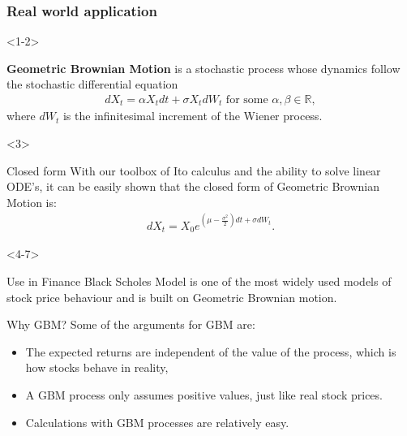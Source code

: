 \documentclass[10pt]{beamer}
\begin{document}
\begin{frame}[t]
  \frametitle{Real world application}
  \begin{onlyenv}<1-2>
    \begin{definition}
      \textbf{Geometric Brownian Motion} is a stochastic process whose dynamics follow the stochastic differential equation 
      \begin{align*}
        dX_t = \alpha X_t dt + \sigma X_t dW_t \text{ for some } \alpha,\beta \in \mathbb{R},
      \end{align*}
      where $dW_t$ is the infinitesimal increment of the Wiener process.
    \end{definition}
  \end{onlyenv}
  \begin{onlyenv}<3>
    \begin{block}{Closed form}
      With our toolbox of Ito calculus and the ability to solve linear ODE's, it can be easily shown that the closed form of Geometric Brownian Motion is:
      \begin{align*}
        dX_t = X_0 e^{(\mu - \frac{\sigma^2}{2})dt + \sigma dW_t}.
      \end{align*}
    \end{block}
  \end{onlyenv}
  \begin{onlyenv}<4-7>
    \begin{block}{Use in Finance}
      Black Scholes Model is one of the most widely used models of stock price behaviour and is built on Geometric Brownian motion.
    \end{block}
    \begin{block}{Why GBM?}
      Some of the arguments for GBM are:
      \begin{itemize}
        \item<6-> The expected returns are independent of the value of the process, which is how stocks behave in reality,
        \item<7-> A GBM process only assumes positive values, just like real stock prices.
        \item<8-> Calculations with GBM processes are relatively easy.
      \end{itemize}
    \end{block}

\end{onlyenv}
\end{frame}
\end{document}

